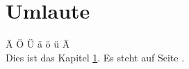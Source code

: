 \chapter{Umlaute}
\label{chap:umlaute}
\"A
\"O
\"U
\"a
\"o
\"u Ä \\ 
Dies ist das Kapitel \ref{chap:umlaute}. Es steht auf Seite \pageref{chap:umlaute}.



